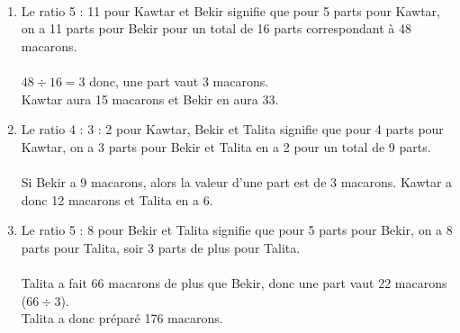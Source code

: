 \ \\ [-5mm]
   \begin{enumerate}
      \item Le ratio 5 : 11 pour Kawtar et Bekir signifie que pour 5 parts pour Kawtar, on a 11 parts pour Bekir pour un total de 16 parts correspondant à 48 macarons. \\ [2mm]
            \qquad {} \\
         $48\div16 =3$ donc, une part vaut 3 macarons. \\
         {\blue Kawtar aura 15 macarons et Bekir en aura 33.}
      \item Le ratio 4 : 3 : 2 pour Kawtar, Bekir et Talita signifie que pour 4 parts pour Kawtar, on a 3 parts pour Bekir et Talita en a 2 pour un total de 9 parts. \\ [2mm]
            \quad {} \\
         Si Bekir a 9 macarons, alors la valeur d'une part est de 3 macarons.
         {\blue Kawtar a donc 12 macarons et Talita en a 6.}
      \item Le ratio 5 : 8 pour Bekir et Talita signifie que pour 5 parts pour Bekir, on a 8 parts pour Talita, soir 3 parts de plus pour Talita.\\ [2mm]
            \qquad {} \\
         Talita a fait 66 macarons de plus que Bekir, donc une part vaut 22 macarons ($66\div3$). \\
         {\blue Talita a donc préparé 176 macarons.}
   \end{enumerate}
